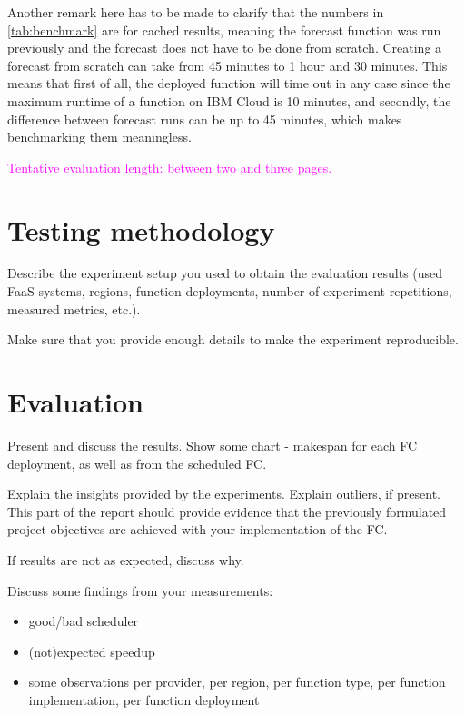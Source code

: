 Another remark here has to be made to clarify that the numbers in \cref{tab:benchmark}
are for cached results, meaning the forecast function was run previously
and the forecast does not have to be done from scratch. Creating a forecast from
scratch can take from 45 minutes to 1 hour and 30 minutes. This means that first of all,
the deployed function will time out in any case since the maximum runtime of a function
on IBM Cloud is 10 minutes, and secondly, the difference between forecast runs can be up
to 45 minutes, which makes benchmarking them meaningless.

\textcolor{magenta}{Tentative evaluation length: between two and three pages.}

%
%
%
\section{Testing methodology}

Describe the experiment setup you used to obtain the evaluation results (used FaaS systems, regions, function deployments, number of experiment repetitions, measured metrics, etc.).

Make sure that you provide enough details to make the experiment reproducible.



%
%
%
\section{Evaluation}

Present and discuss the results. Show some chart - makespan for each FC deployment, as well as from the scheduled FC.

Explain the insights provided by the experiments. Explain outliers, if present.
This part of the report should provide evidence that the previously formulated project objectives are achieved with your implementation of the FC.

If results are not as expected, discuss why.

Discuss some findings from your measurements:
\begin{itemize}
    \item good/bad scheduler
    \item (not)expected speedup
    \item some observations per provider, per region, per function type, per function implementation, per function deployment
\end{itemize}
